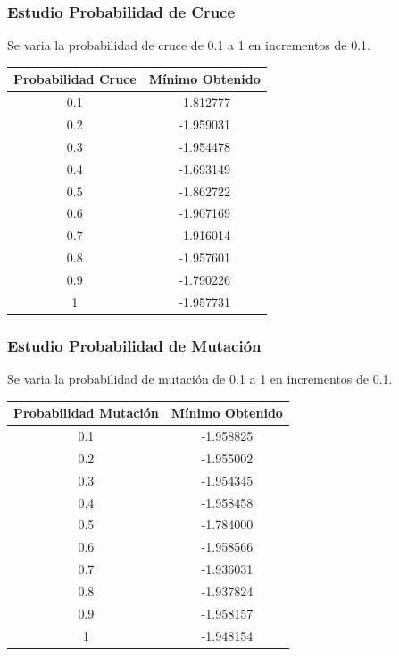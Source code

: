 \documentclass[12pt]{article}
\begin{document}
\subsubsection*{Estudio Probabilidad de Cruce}
	Se varia la probabilidad de cruce de 0.1 a 1 en incrementos de 0.1.
\begin{table}[H]
\begin{center}
\begin{tabular}{|cc|} \hline
Probabilidad Cruce & Mínimo Obtenido \\  \hline
0.1 & -1.812777 \\ 
0.2 & -1.959031 \\ 
0.3 & -1.954478 \\
0.4 & -1.693149 \\
0.5 & -1.862722 \\
0.6 & -1.907169 \\
0.7 & -1.916014 \\
0.8 & -1.957601 \\ 
0.9 & -1.790226 \\
1   & -1.957731 \\  \hline
\end{tabular}
\end{center}
\end{table}
\subsubsection*{Estudio Probabilidad de Mutación}
	Se varia la probabilidad de mutación de 0.1 a 1 en incrementos de 0.1.
\begin{table}[H]
\begin{center}
\begin{tabular}{|cc|} \hline
Probabilidad Mutación & Mínimo Obtenido \\  \hline
0.1 & -1.958825 \\ 
0.2 & -1.955002 \\ 
0.3 & -1.954345 \\
0.4 & -1.958458 \\
0.5 & -1.784000 \\
0.6 & -1.958566 \\
0.7 & -1.936031 \\
0.8 & -1.937824 \\ 
0.9 & -1.958157 \\
1   & -1.948154 \\  \hline
\end{tabular}
\end{center}
\end{table}
\end{document}
